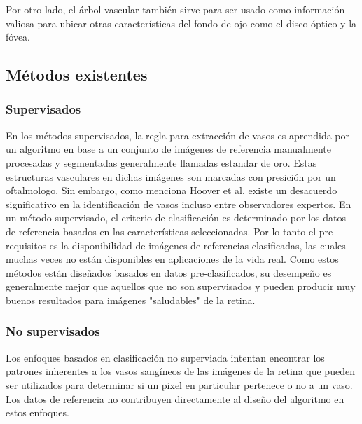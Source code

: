 Por otro lado, el árbol vascular también sirve para ser usado como información valiosa para ubicar otras características del fondo de ojo como el disco óptico y la fóvea. \cite{marin2011new}

	\subsection{M\'etodos existentes}



	\subsubsection{Supervisados}

En los m\'etodos supervisados, la regla para extracci\'on de vasos es aprendida por un algoritmo en base a un conjunto de im\'agenes de referencia manualmente procesadas y segmentadas generalmente llamadas estandar de oro. Estas estructuras vasculares en dichas im\'agenes son marcadas con presici\'on por un oftalmologo. Sin embargo, como menciona Hoover et al. \cite{hoover2000locating} existe un desacuerdo significativo en la identificaci\'on de vasos incluso entre observadores expertos. En un m\'etodo supervisado, el criterio de clasificaci\'on es determinado por los datos de referencia basados en las caracter\'isticas seleccionadas. Por lo tanto el pre-requisitos es la disponibilidad de im\'agenes de referencias clasificadas, las cuales muchas veces no est\'an disponibles en aplicaciones de la vida real. Como estos m\'etodos est\'an dise\~nados basados en datos pre-clasificados, su desempeño es generalmente mejor que aquellos que no son supervisados y pueden producir muy buenos resultados para im\'agenes "saludables" de la retina.

	\subsubsection{No supervisados}


Los enfoques basados en clasificaci\'on no superviada intentan encontrar los patrones inherentes a los vasos sang\'ineos de las im\'agenes de la retina que pueden ser utilizados para determinar si un pixel en particular pertenece o no a un vaso. Los datos de referencia no contribuyen directamente al dise\~no del algoritmo en estos enfoques.

